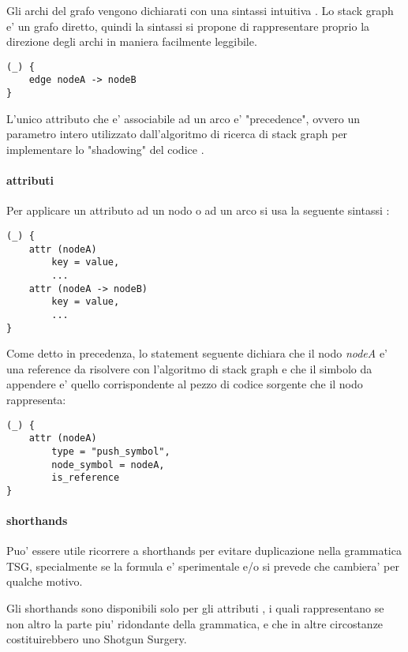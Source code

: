 Gli archi del grafo vengono dichiarati con una sintassi intuitiva \cite{TreeSitterGraphReferenceEdges}.
Lo stack graph e' un grafo diretto, quindi la sintassi si propone di rappresentare proprio la direzione degli archi in maniera facilmente leggibile.

\begin{Verbatim}[samepage=true]
(_) {
    edge nodeA -> nodeB
}
\end{Verbatim}

L'unico attributo che e' associabile ad un arco e' "precedence", ovvero un parametro intero utilizzato dall'algoritmo di ricerca di stack graph per implementare lo "shadowing" del codice \cite{TreeSitterStackGraphEdges}.

\paragraph{attributi}

Per applicare un attributo ad un nodo o ad un arco si usa la seguente sintassi \cite{TreeSitterGraphReferenceAttributes}:

\begin{Verbatim}[samepage=true]
(_) {
    attr (nodeA)
        key = value,
        ...
    attr (nodeA -> nodeB)
        key = value,
        ...
}
\end{Verbatim}

Come detto in precedenza, lo statement seguente dichiara che il nodo \emph{nodeA} e' una reference da risolvere con l'algoritmo di stack graph e che il simbolo da appendere e' quello corrispondente al pezzo di codice sorgente che il nodo rappresenta:

\begin{Verbatim}[samepage=true]
(_) {
    attr (nodeA)
        type = "push_symbol",
        node_symbol = nodeA,
        is_reference
}
\end{Verbatim}

\paragraph{shorthands}
Puo' essere utile ricorrere a shorthands per evitare duplicazione nella grammatica TSG, specialmente se la formula e' sperimentale e/o si prevede che cambiera' per qualche motivo.

Gli shorthands sono disponibili solo per gli attributi \cite{TreeSitterGraphReferenceAttributeShorthands}, i quali rappresentano se non altro la parte piu' ridondante della grammatica, e che in altre circostanze costituirebbero uno Shotgun Surgery.

